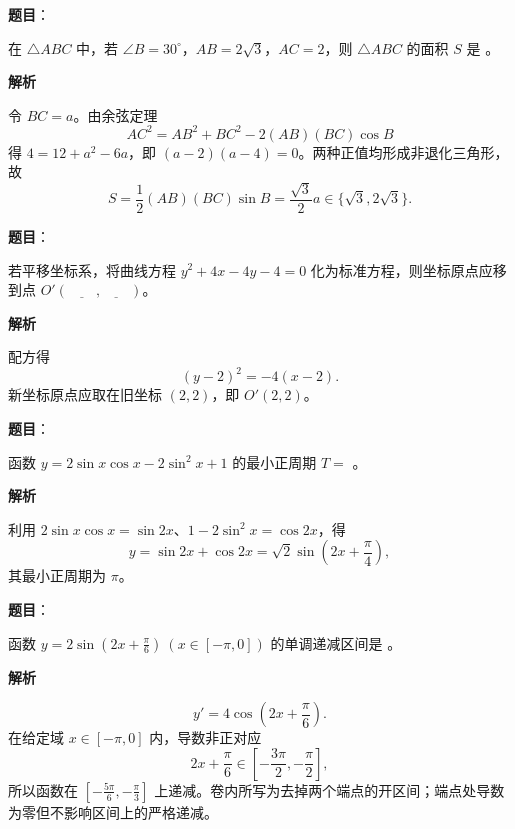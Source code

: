 \begin{answer}

\textbf{题目}：

在 $\triangle ABC$ 中，若 $\angle B=30^\circ$，$AB=2\sqrt3$，$AC=2$，则 $\triangle ABC$ 的面积 $S$ 是 \gkblank{}。

\textbf{解析}

令 $BC=a$。由余弦定理
\nopagebreak[4]
\[
AC^2=AB^2+BC^2-2(AB)(BC)\cos B
\]
得 $4=12+a^2-6a$，即 $(a-2)(a-4)=0$。两种正值均形成非退化三角形，故
\nopagebreak[4]
\[
S=\frac12(AB)(BC)\sin B=\frac{\sqrt3}{2}a\in\{\sqrt3,2\sqrt3\}.
\]


\end{answer}
\begin{answer}

\textbf{题目}：

若平移坐标系，将曲线方程 $y^2+4x-4y-4=0$ 化为标准方程，则坐标原点应移到点 $O'(\underline{\qquad},\underline{\qquad})$。

\textbf{解析}

配方得
\nopagebreak[4]
\[
(y-2)^2=-4(x-2).
\]
新坐标原点应取在旧坐标 $(2,2)$，即 $O'(2,2)$。


\end{answer}
\begin{answer}

\textbf{题目}：

函数 $y=2\sin x\cos x-2\sin^2x+1$ 的最小正周期 $T=$ \gkblank{}。

\textbf{解析}

利用 $2\sin x\cos x=\sin2x$、$1-2\sin^2x=\cos2x$，得
\nopagebreak[4]
\[
y=\sin2x+\cos2x=\sqrt2\sin\left(2x+\frac\pi4\right),
\]
其最小正周期为 $\pi$。


\end{answer}
\begin{answer}

\textbf{题目}：

函数 $y=2\sin\left(2x+\frac\pi6\right)\ (x\in[-\pi,0])$ 的单调递减区间是 \gkblank{}。

\textbf{解析}

\nopagebreak[4]
\[
y'=4\cos\left(2x+\frac\pi6\right).
\]
在给定域 $x\in[-\pi,0]$ 内，导数非正对应
\nopagebreak[4]
\[
2x+\frac\pi6\in\left[-\frac{3\pi}{2},-\frac\pi2\right],
\]
所以函数在 $\left[-\frac{5\pi}{6},-\frac\pi3\right]$ 上递减。卷内所写为去掉两个端点的开区间；端点处导数为零但不影响区间上的严格递减。


\end{answer}
